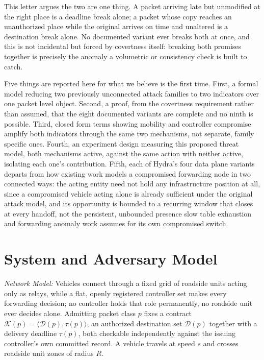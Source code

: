 \documentclass[lettersize,journal]{IEEEtran}
\begin{document}
This letter argues the two are one thing. A packet arriving late but unmodified at the right place is a deadline break alone; a packet whose copy reaches an unauthorized place while the original arrives on time and unaltered is a destination break alone. No documented variant ever breaks both at once, and this is not incidental but forced by covertness itself: breaking both promises together is precisely the anomaly a volumetric or consistency check is built to catch.

Five things are reported here for what we believe is the first time. First, a formal model reducing two previously unconnected attack families to two indicators over one packet level object. Second, a proof, from the covertness requirement rather than assumed, that the eight documented variants are complete and no ninth is possible. Third, closed form terms showing mobility and controller compromise amplify both indicators through the same two mechanisms, not separate, family specific ones. Fourth, an experiment design measuring this proposed threat model, both mechanisms active, against the same action with neither active, isolating each one's contribution. Fifth, each of Hydra's four data plane variants departs from how existing work models a compromised forwarding node in two connected ways: the acting entity need not hold any infrastructure position at all, since a compromised vehicle acting alone is already sufficient under the original attack model, and its opportunity is bounded to a recurring window that closes at every handoff, not the persistent, unbounded presence slow table exhaustion and forwarding anomaly work assumes for its own compromised switch.

\section{System and Adversary Model}
\label{sec:model}
\textit{Network Model:} Vehicles connect through a fixed grid of roadside units acting only as relays, while a flat, openly registered controller set makes every forwarding decision; no controller holds that role permanently, no roadside unit ever decides alone. Admitting packet class $p$ fixes a contract $\mathcal{K}(p) = \langle \mathcal{D}(p), \tau(p) \rangle$, an authorized destination set $\mathcal{D}(p)$ together with a delivery deadline $\tau(p)$, both checkable independently against the issuing controller's own committed record. A vehicle travels at speed $s$ and crosses roadside unit zones of radius $R$.
\end{document}
